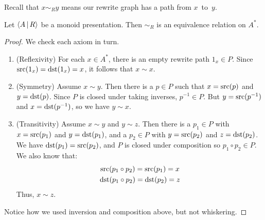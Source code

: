 \documentclass[../generics]{subfiles}
\begin{document}
Recall that $x\sim_R y$ means our rewrite graph has a path from $x$~to~$y$.

\begin{proposition}
Let $\langle A\,|\,R\rangle$ be a monoid presentation. Then $\sim_R$ is an equivalence relation on $A^*$.
\end{proposition}
\begin{proof}
We check each axiom in turn.
\begin{enumerate}
\item {}(Reflexivity) For each $x\in A^*$, there is an empty rewrite path $1_x\in P$. Since $\operatorname{src}(1_x)=\operatorname{dst}(1_x)=x$, it follows that $x\sim x$.
\item {}(Symmetry) Assume $x\sim y$. Then there is a $p\in P$ such that $x=\operatorname{src}(p)$ and $y=\operatorname{dst}(p)$. Since $P$ is closed under taking inverses, $p^{-1}\in P$. But $y=\operatorname{src}(p^{-1})$ and $x=\operatorname{dst}(p^{-1})$, so we have $y\sim x$.
\item {}(Transitivity) Assume $x\sim y$ and $y\sim z$. Then there is a $p_1\in P$ with $x=\operatorname{src}(p_1)$ and $y=\operatorname{dst}(p_1)$, and a $p_2\in P$ with $y=\operatorname{src}(p_2)$ and $z=\operatorname{dst}(p_2)$. We have $\operatorname{dst}(p_1)=\operatorname{src}(p_2)$, and $P$ is closed under composition so $p_1\circ p_2 \in P$. We also know that:
\begin{gather*}
\operatorname{src}(p_1\circ p_2)=\operatorname{src}(p_1)=x\\
\operatorname{dst}(p_1\circ p_2)=\operatorname{dst}(p_2)=z
\end{gather*}
Thus, $x\sim z$.
\end{enumerate}
Notice how we used inversion and composition above, but not whiskering.
\end{proof}
\end{document}
